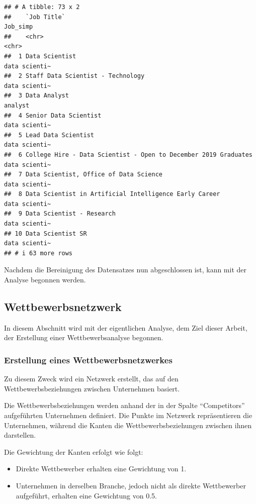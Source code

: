\documentclass[
]{article}
\providecommand{\tightlist}{%
  \setlength{\itemsep}{0pt}\setlength{\parskip}{0pt}}
\begin{document}
\begin{verbatim}
## # A tibble: 73 x 2
##    `Job Title`                                                     Job_simp     
##    <chr>                                                           <chr>        
##  1 Data Scientist                                                  data scienti~
##  2 Staff Data Scientist - Technology                               data scienti~
##  3 Data Analyst                                                    analyst      
##  4 Senior Data Scientist                                           data scienti~
##  5 Lead Data Scientist                                             data scienti~
##  6 College Hire - Data Scientist - Open to December 2019 Graduates data scienti~
##  7 Data Scientist, Office of Data Science                          data scienti~
##  8 Data Scientist in Artificial Intelligence Early Career          data scienti~
##  9 Data Scientist - Research                                       data scienti~
## 10 Data Scientist SR                                               data scienti~
## # i 63 more rows
\end{verbatim}

Nachdem die Bereinigung des Datensatzes nun abgeschlossen ist, kann mit
der Analyse begonnen werden.

\subsection{Wettbewerbsnetzwerk}\label{wettbewerbsnetzwerk}

In diesem Abschnitt wird mit der eigentlichen Analyse, dem Ziel dieser
Arbeit, der Erstellung einer Wettbewerbsanalyse begonnen.

\subsubsection{Erstellung eines
Wettbewerbsnetzwerkes}\label{erstellung-eines-wettbewerbsnetzwerkes}

Zu diesem Zweck wird ein Netzwerk erstellt, das auf den
Wettbewerbsbeziehungen zwischen Unternehmen basiert.

Die Wettbewerbsbeziehungen werden anhand der in der Spalte
``Competitors'' aufgeführten Unternehmen definiert. Die Punkte im
Netzwerk repräsentieren die Unternehmen, während die Kanten die
Wettbewerbsbeziehungen zwischen ihnen darstellen.

Die Gewichtung der Kanten erfolgt wie folgt:

\begin{itemize}
\tightlist
\item
  Direkte Wettbewerber erhalten eine Gewichtung von 1.
\item
  Unternehmen in derselben Branche, jedoch nicht als direkte
  Wettbewerber aufgeführt, erhalten eine Gewichtung von 0.5.
\end{itemize}
\end{document}
